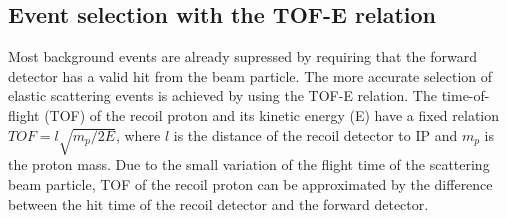 \documentclass[number,5p]{elsarticle}
\begin{document}
\subsection{Event selection with the TOF-E relation}
\label{sec:tofe_selection}

Most background events are already supressed by requiring that the forward detector has a valid
hit from the beam particle.
The more accurate selection of elastic scattering events is achieved by using the TOF-E relation.
The time-of-flight (TOF) of the recoil proton and its kinetic energy (E)
have a fixed relation $TOF = l\sqrt{m_p/2E}$, where $l$ is the distance of
the recoil detector to IP and $m_p$ is the proton mass.
Due to the small variation of the flight time of the scattering beam particle,
TOF of the recoil proton can be approximated by the difference between the hit time of the recoil detector and the forward detector.
\end{document}
